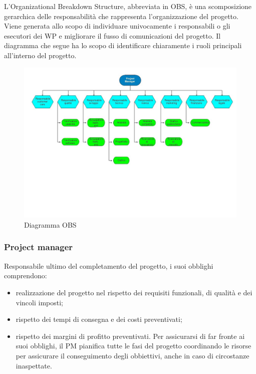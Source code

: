 L\textquoteright{}Organizational Breakdown Structure, abbreviata in OBS, \`{e} una scomposizione gerarchica delle responsabilit\`{a} che rappresenta l\textquoteright{}organizzazione del progetto. Viene generata allo scopo di individuare univocamente i responsabili o gli esecutori dei WP e migliorare il fusso di comunicazioni del progetto. Il diagramma che segue ha lo scopo di identificare chiaramente i ruoli principali all\textquoteright{}interno del progetto.

\begin{figure}[H]
\centering %
\includegraphics[scale=0.5]{img/Progetto2.jpg}
\caption{Diagramma OBS}
\label{fig:Diagramma OBS}
\end{figure}

\subsubsection{Project manager}
Responsabile ultimo del completamento del progetto, i suoi obblighi comprendono:
\begin{itemize}
\item realizzazione del progetto nel rispetto dei requisiti funzionali, di qualit\`{a} e dei
vincoli imposti;
\item rispetto dei tempi di consegna e dei costi preventivati;
\item rispetto dei margini di profitto preventivati.
Per assicurarsi di far fronte ai suoi obblighi, il PM pianifica tutte le fasi del progetto
coordinando le risorse per assicurare il conseguimento degli obbiettivi, anche in caso di
circostanze inaspettate.
\end{itemize}


